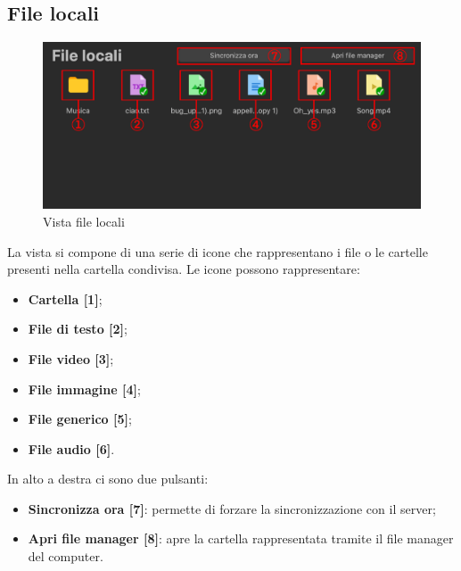 \subsection{File locali}
\label{sec:fileLocali}
\begin{figure}[H]
    \centering
    \includegraphics[scale = 0.9]{components/img/fileLocali.png}
    \caption{Vista file locali}
    \label{fig:fileSync}
\end{figure}
La vista si compone di una serie di icone che rappresentano i file o le cartelle presenti nella cartella condivisa. Le icone possono rappresentare:
\begin{itemize}
\item \textbf{Cartella [1]};\
\item \textbf{File di testo [2]};\
\item \textbf{File video [3]};\
\item \textbf{File immagine [4]};\
\item \textbf{File generico [5]};\
\item \textbf{File audio [6]}.\
\end{itemize}
In alto a destra ci sono due pulsanti:
\begin{itemize}
\item \textbf{Sincronizza ora [7]}: permette di forzare la sincronizzazione con il server;\
\item \textbf{Apri file manager [8]}: apre la cartella rappresentata tramite il file manager del computer.\
\end{itemize}


